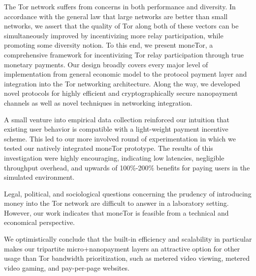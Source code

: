 The Tor network suffers from concerns in both performance and
diversity. In accordance with the general law that large networks are better than
small networks, we assert that the quality of Tor along both of these vectors
can be simultaneously improved by incentivizing more relay participation, while promoting some diversity notion. To this end, we
present moneTor, a comprehensive framework for incentivizing Tor relay
participation through true monetary payments. Our design broadly covers every
major level of implementation from general economic model to the protocol
payment layer and integration into the Tor networking architecture. Along the
way, we developed novel protocols for highly efficient and cryptographically
secure nanopayment channels as well as novel techniques in networking
integration.

A small venture into empirical data collection reinforced our intuition that
existing user behavior is compatible with a light-weight payment incentive
scheme. This led to our more involved round of experimentation in which we
tested our natively integrated moneTor prototype. The results of this
investigation were highly encouraging, indicating low latencies, negligible
throughput overhead, and upwards of 100\%-200\% benefits for paying users in the
simulated environment.

Legal, political, and sociological questions concerning the prudency of
introducing money into the Tor network are difficult to answer in a laboratory
setting. However, our work indicates that moneTor is feasible from a
technical and economical perspective.

We optimistically conclude that the built-in efficiency and scalability in particular makes our tripartite micro+nanopayment layers an attractive option for other usage than Tor bandwidth prioritization, such as metered video viewing, metered video gaming, and pay-per-page websites.

